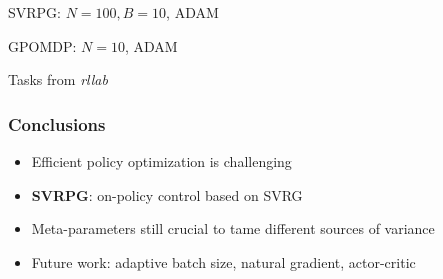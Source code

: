 \documentclass[aspectratio=169]{beamer}
\newcommand{\enb}[1]{\textcolor{poliblue1}{\textbf{#1}}}
\begin{document}
\begin{frame}
\vfill
\small{
SVRPG: $N=100, B=10$, ADAM 

GPOMDP: $N=10$, ADAM 

Tasks from \textit{rllab}~\citep{duan2016benchmarking}
}
\end{frame}

\begin{frame} 
\frametitle{Conclusions} 

\begin{itemize}
	\item Efficient policy optimization is challenging
	\item \enb{SVRPG}: on-policy control based on SVRG
	\item Meta-parameters still crucial to tame different sources of variance
	\item Future work: adaptive batch size, natural gradient, actor-critic
\end{itemize}

\end{frame}
\end{document}
